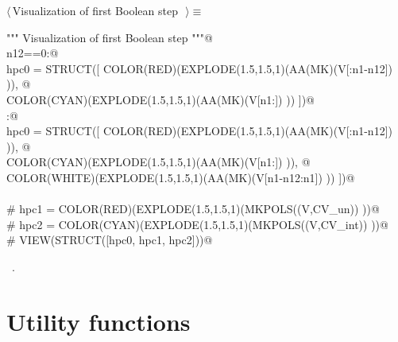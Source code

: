 \documentclass[11pt,oneside]{article}	%
\begin{document}
\begin{flushleft} \small \label{scrap40}
$\langle\,$Visualization of first Boolean step\nobreak\ {\footnotesize {}}$\,\rangle\equiv$
\vspace{-1ex}
\begin{list}{}{} \item
\mbox{}\verb@""" Visualization of first Boolean step  """@\\
\mbox{}\verb@if n12==0:@\\
\mbox{}\verb@   hpc0 = STRUCT([ COLOR(RED)(EXPLODE(1.5,1.5,1)(AA(MK)(V[:n1-n12]) )), @\\
\mbox{}\verb@            COLOR(CYAN)(EXPLODE(1.5,1.5,1)(AA(MK)(V[n1:]) )) ])@\\
\mbox{}\verb@else:@\\
\mbox{}\verb@   hpc0 = STRUCT([ COLOR(RED)(EXPLODE(1.5,1.5,1)(AA(MK)(V[:n1-n12]) )), @\\
\mbox{}\verb@            COLOR(CYAN)(EXPLODE(1.5,1.5,1)(AA(MK)(V[n1:]) )), @\\
\mbox{}\verb@            COLOR(WHITE)(EXPLODE(1.5,1.5,1)(AA(MK)(V[n1-n12:n1]) )) ])@\\
\mbox{}\verb@@\\
\mbox{}\verb@# hpc1 = COLOR(RED)(EXPLODE(1.5,1.5,1)(MKPOLS((V,CV_un)) ))@\\
\mbox{}\verb@# hpc2 = COLOR(CYAN)(EXPLODE(1.5,1.5,1)(MKPOLS((V,CV_int)) ))@\\
\mbox{}\verb@# VIEW(STRUCT([hpc0, hpc1, hpc2]))@\\
\mbox{}\verb@@{\NWsep}
\end{list}
\vspace{-1ex}
\footnotesize\addtolength{\baselineskip}{-1ex}
\begin{list}{}{\setlength{\itemsep}{-\parsep}\setlength{\itemindent}{-\leftmargin}}
\item \NWtxtMacroRefIn\ .
\end{list}
\end{flushleft}

\appendix
\section{Utility functions}
\end{document}
